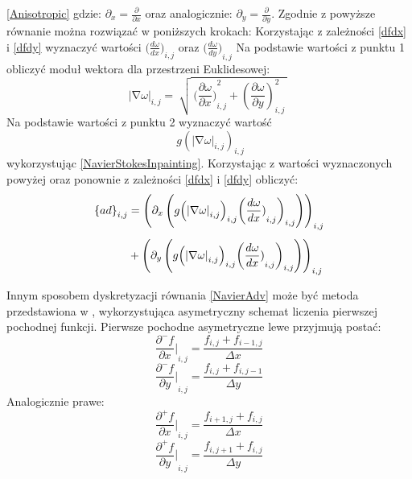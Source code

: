 \documentclass[12pt, twoside, openany]{report}
\theoremstyle{definition}
\begin{document}
\eqref{Anisotropic}
gdzie: ${\partial }_x=\frac{\partial }{\partial x}$ oraz analogicznie: ${\partial }_y=\frac{\partial }{\partial y}$.
Zgodnie z \cite{ebrahimi2012navier} powyższe równanie można rozwiązać w poniższych krokach:
Korzystając z zależności \eqref{dfdx} i \eqref{dfdy} wyznaczyć wartości $({\frac{d\omega }{dx})}_{i,j}$ oraz $({\frac{d\omega }{dy})}_{i,j}$
Na podstawie wartości z punktu 1 obliczyć moduł wektora dla przestrzeni Euklidesowej:
\begin{equation}
{\left|\mathrm{\nabla }\omega \right|}_{i,j}=\ \sqrt{\mathrm{\ }({\frac{\partial \omega }{\partial x})}^2_{i,j}+{\left(\frac{\partial \omega }{\partial y}\right)}^2_{i,j}\ }\
\label{magnitudedw}
\end{equation}
Na podstawie wartości z punktu 2 wyznaczyć wartość $$\ g{\left({\left|\mathrm{\nabla }\omega \right|}_{i,j}\right)}_{i,j}$$ wykorzystując \eqref{NavierStokesInpainting}. Korzystając z wartości wyznaczonych powyżej oraz ponownie z zależności \eqref{dfdx} i \eqref{dfdy} obliczyć:
\begin{align}
{\left\{ad\right\}}_{i,j} &= {\left({\partial }_x\left(g{\left({\left|\mathrm{\nabla }\omega \right|}_{i,j}\right)}_{i,j}{\left({\frac{d\omega }{dx})}_{i,j}\right)}_{i,j}\right)\right)}_{i,j} \notag \\[1ex]
&+ {\left({\partial }_y\left(g{\left({\left|\mathrm{\nabla }\omega \right|}_{i,j}\right)}_{i,j}{\left({\frac{d\omega }{dx})}_{i,j}\right)}_{i,j}\right)\right)}_{i,j}
\label{discreteAnisotropic}
\end{align}
\par
Innym sposobem dyskretyzacji równania \eqref{NavierAdv} może być metoda przedstawiona w \cite{van2005algorithms}, wykorzystująca asymetryczny schemat liczenia pierwszej pochodnej funkcji. Pierwsze pochodne asymetryczne lewe przyjmują postać:
\begin{equation}
{\frac{{\partial }^-f}{\partial x}|}_{i,j}=\frac{f_{i,j}+f_{i-1,j}}{\Delta x}
\label{leftdfdx}
\end{equation}
\begin{equation}
{\frac{{\partial }^-f}{\partial y}|}_{i,j}=\frac{f_{i,j}+f_{i,j-1}}{\Delta y}
\label{leftdfdy}
\end{equation}
Analogicznie prawe:
\begin{equation}
{\frac{{\partial }^+f}{\partial x}|}_{i,j}=\frac{f_{i+1,j}+f_{i,j}}{\Delta x} 
\label{rightdfdx}
\end{equation}
\begin{equation}
{\frac{{\partial }^+f}{\partial y}|}_{i,j}=\frac{f_{i,j+1}+f_{i,j}}{\Delta y}
\label{rightdfdy}
\end{equation}
\end{document}
